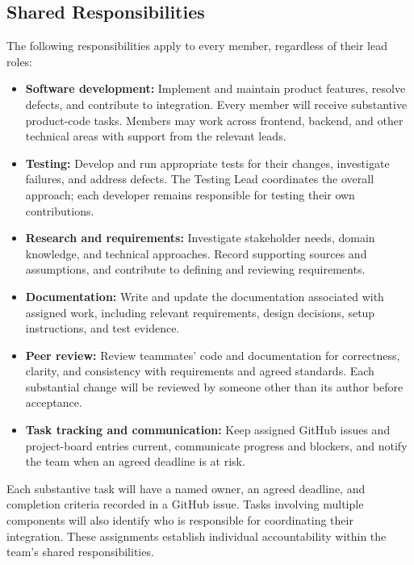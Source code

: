 \documentclass{article}
\begin{document}
\FloatBarrier
\subsection{Shared Responsibilities}
\label{sec:shared-responsibilities}

The following responsibilities apply to every member, regardless of
their lead roles:

\begin{itemize}
    \item \textbf{Software development:}
    Implement and maintain product features, resolve defects, and
    contribute to integration. Every member will receive substantive
    product-code tasks. Members may work across frontend, backend,
    and other technical areas with support from the relevant leads.

    \item \textbf{Testing:}
    Develop and run appropriate tests for their changes, investigate
    failures, and address defects. The Testing Lead coordinates the
    overall approach; each developer remains responsible for testing
    their own contributions.

    \item \textbf{Research and requirements:}
    Investigate stakeholder needs, domain knowledge, and technical
    approaches. Record supporting sources and assumptions, and
    contribute to defining and reviewing requirements.

    \item \textbf{Documentation:}
    Write and update the documentation associated with assigned work,
    including relevant requirements, design decisions, setup
    instructions, and test evidence.

    \item \textbf{Peer review:}
    Review teammates' code and documentation for correctness, clarity,
    and consistency with requirements and agreed standards. Each
    substantial change will be reviewed by someone other than its
    author before acceptance.

    \item \textbf{Task tracking and communication:}
    Keep assigned GitHub issues and project-board entries current,
    communicate progress and blockers, and notify the team when an
    agreed deadline is at risk.
\end{itemize}

Each substantive task will have a named owner, an agreed deadline, and
completion criteria recorded in a GitHub issue. Tasks involving multiple
components will also identify who is responsible for coordinating their
integration. These assignments establish individual accountability
within the team's shared responsibilities.
\end{document}
